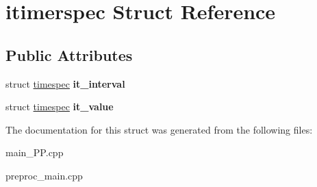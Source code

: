 \hypertarget{structitimerspec}{\section{itimerspec Struct Reference}
\label{structitimerspec}
}
\subsection*{Public Attributes}
\begin{DoxyCompactItemize}
\item 
\hypertarget{structitimerspec_a27cedae552e2b2fe0993c1b2c4ff1889}{struct \hyperlink{structtimespec}{timespec} {\bfseries it\+\_\+interval}}\label{structitimerspec_a27cedae552e2b2fe0993c1b2c4ff1889}

\item 
\hypertarget{structitimerspec_a754dda918053251c24558b07571d6e8f}{struct \hyperlink{structtimespec}{timespec} {\bfseries it\+\_\+value}}\label{structitimerspec_a754dda918053251c24558b07571d6e8f}

\end{DoxyCompactItemize}


The documentation for this struct was generated from the following files\+:\begin{DoxyCompactItemize}
\item 
main\+\_\+\+P\+P.\+cpp\item 
preproc\+\_\+main.\+cpp\end{DoxyCompactItemize}
